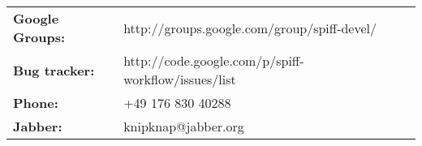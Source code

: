 \begin{tabular}{ll}
{\bf Google Groups:} & http://groups.google.com/group/spiff-devel/ \\
{\bf Bug tracker:}   & http://code.google.com/p/spiff-workflow/issues/list \\
{\bf Phone:}         & +49 176 830 40288 \\
{\bf Jabber:}        & knipknap@jabber.org
\end{tabular}
